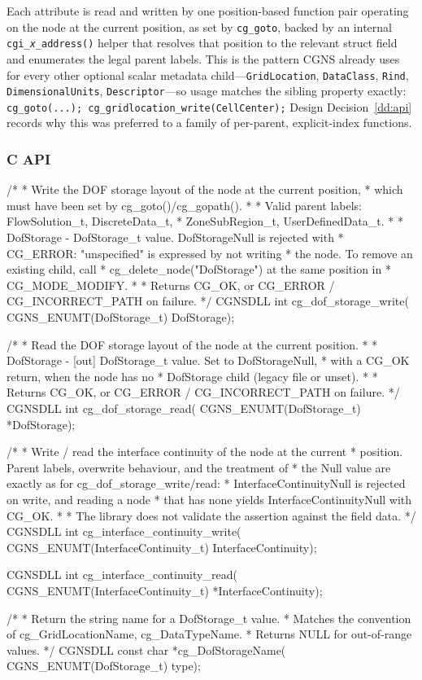 \documentclass[11pt,letterpaper]{article}
\makeatletter
\let\cgns@orig@lstlisting\lstlisting
\let\cgns@endorig@lstlisting\endlstlisting
\renewenvironment{lstlisting}
  {\par\needspace{5\baselineskip}\nolinenumbers\cgns@orig@lstlisting}
  {\cgns@endorig@lstlisting\par\linenumbers}
\makeatother
\begin{document}
Each attribute is read and written by one position-based function pair
operating on the node at the current position, as set by
\texttt{cg\_goto}, backed by an internal
\texttt{cgi\_\textit{x}\_address()} helper that resolves that position
to the relevant struct field and enumerates the legal parent labels.
This is the pattern CGNS already uses for every other optional scalar
metadata child---\texttt{GridLocation}, \texttt{DataClass},
\texttt{Rind}, \texttt{DimensionalUnits}, \texttt{Descriptor}---so
usage matches the sibling property exactly:
\texttt{cg\_goto(...); cg\_gridlocation\_write(CellCenter);}
Design Decision~\ref{dd:api} records why this was preferred to a family
of per-parent, explicit-index functions.

\subsubsection{C API}

\begin{lstlisting}[language=C]
/*
 * Write the DOF storage layout of the node at the current position,
 * which must have been set by cg_goto()/cg_gopath().
 *
 * Valid parent labels: FlowSolution_t, DiscreteData_t,
 *                      ZoneSubRegion_t, UserDefinedData_t.
 *
 * DofStorage - DofStorage_t value.  DofStorageNull is rejected with
 *              CG_ERROR: "unspecified" is expressed by not writing
 *              the node.  To remove an existing child, call
 *              cg_delete_node("DofStorage") at the same position in
 *              CG_MODE_MODIFY.
 *
 * Returns CG_OK, or CG_ERROR / CG_INCORRECT_PATH on failure.
 */
CGNSDLL int cg_dof_storage_write(
    CGNS_ENUMT(DofStorage_t) DofStorage);

/*
 * Read the DOF storage layout of the node at the current position.
 *
 * DofStorage - [out] DofStorage_t value.  Set to DofStorageNull,
 *              with a CG_OK return, when the node has no
 *              DofStorage child (legacy file or unset).
 *
 * Returns CG_OK, or CG_ERROR / CG_INCORRECT_PATH on failure.
 */
CGNSDLL int cg_dof_storage_read(
    CGNS_ENUMT(DofStorage_t) *DofStorage);

/*
 * Write / read the interface continuity of the node at the current
 * position.  Parent labels, overwrite behaviour, and the treatment of
 * the Null value are exactly as for cg_dof_storage_write/read:
 * InterfaceContinuityNull is rejected on write, and reading a node
 * that has none yields InterfaceContinuityNull with CG_OK.
 *
 * The library does not validate the assertion against the field data.
 */
CGNSDLL int cg_interface_continuity_write(
    CGNS_ENUMT(InterfaceContinuity_t) InterfaceContinuity);

CGNSDLL int cg_interface_continuity_read(
    CGNS_ENUMT(InterfaceContinuity_t) *InterfaceContinuity);

/*
 * Return the string name for a DofStorage_t value.
 * Matches the convention of cg_GridLocationName, cg_DataTypeName.
 * Returns NULL for out-of-range values.
 */
CGNSDLL const char *cg_DofStorageName(
    CGNS_ENUMT(DofStorage_t) type);
\end{lstlisting}
\end{document}
